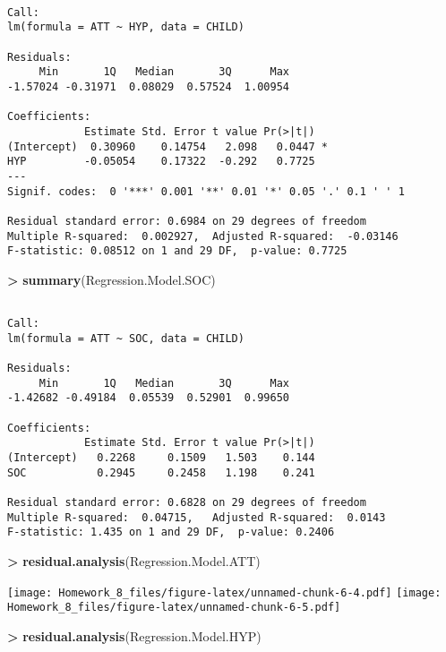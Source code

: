 \documentclass[]{article}
\newenvironment{Shaded}{\begin{snugshade}}{\end{snugshade}}
\newcommand{\KeywordTok}[1]{\textcolor[rgb]{0.13,0.29,0.53}{\textbf{#1}}}
\newcommand{\StringTok}[1]{\textcolor[rgb]{0.31,0.60,0.02}{#1}}
\newcommand{\OperatorTok}[1]{\textcolor[rgb]{0.81,0.36,0.00}{\textbf{#1}}}
\newcommand{\NormalTok}[1]{#1}
\begin{document}
\begin{verbatim}

Call:
lm(formula = ATT ~ HYP, data = CHILD)

Residuals:
     Min       1Q   Median       3Q      Max 
-1.57024 -0.31971  0.08029  0.57524  1.00954 

Coefficients:
            Estimate Std. Error t value Pr(>|t|)  
(Intercept)  0.30960    0.14754   2.098   0.0447 *
HYP         -0.05054    0.17322  -0.292   0.7725  
---
Signif. codes:  0 '***' 0.001 '**' 0.01 '*' 0.05 '.' 0.1 ' ' 1

Residual standard error: 0.6984 on 29 degrees of freedom
Multiple R-squared:  0.002927,  Adjusted R-squared:  -0.03146 
F-statistic: 0.08512 on 1 and 29 DF,  p-value: 0.7725
\end{verbatim}

\begin{Shaded}
\begin{Highlighting}[]
\OperatorTok{>}\StringTok{ }\KeywordTok{summary}\NormalTok{(Regression.Model.SOC)}
\end{Highlighting}
\end{Shaded}

\begin{verbatim}

Call:
lm(formula = ATT ~ SOC, data = CHILD)

Residuals:
     Min       1Q   Median       3Q      Max 
-1.42682 -0.49184  0.05539  0.52901  0.99650 

Coefficients:
            Estimate Std. Error t value Pr(>|t|)
(Intercept)   0.2268     0.1509   1.503    0.144
SOC           0.2945     0.2458   1.198    0.241

Residual standard error: 0.6828 on 29 degrees of freedom
Multiple R-squared:  0.04715,   Adjusted R-squared:  0.0143 
F-statistic: 1.435 on 1 and 29 DF,  p-value: 0.2406
\end{verbatim}

\begin{Shaded}
\begin{Highlighting}[]
\OperatorTok{>}\StringTok{ }\KeywordTok{residual.analysis}\NormalTok{(Regression.Model.ATT)}
\end{Highlighting}
\end{Shaded}

\texttt{[image: Homework\_8\_files/figure-latex/unnamed-chunk-6-4.pdf]}
\texttt{[image: Homework\_8\_files/figure-latex/unnamed-chunk-6-5.pdf]}

\begin{Shaded}
\begin{Highlighting}[]
\OperatorTok{>}\StringTok{ }\KeywordTok{residual.analysis}\NormalTok{(Regression.Model.HYP)}
\end{Highlighting}
\end{Shaded}
\end{document}
